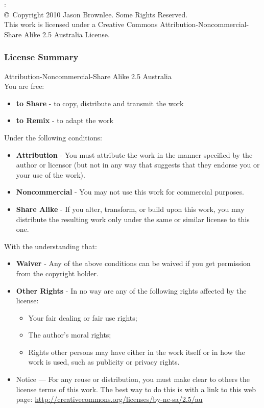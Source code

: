 

\begin{flushleft}

\mybooktitle: \mybooksubtitle \\
\copyright\ Copyright 2010 Jason Brownlee. Some Rights Reserved. \\
This work is licensed under a Creative Commons Attribution-Noncommercial-Share Alike 2.5 Australia License.


\subsubsection*{License Summary}
Attribution-Noncommercial-Share Alike 2.5 Australia \\

You are free:
\begin{itemize}
	\item \textbf{to Share} - to copy, distribute and transmit the work
	\item \textbf{to Remix} - to adapt the work
\end{itemize}

Under the following conditions:
\begin{itemize}
	\item \textbf{Attribution} - You must attribute the work in the manner specified by the author or licensor (but not in any way that suggests that they endorse you or your use of the work).
	\item \textbf{Noncommercial} - You may not use this work for commercial purposes.
	\item \textbf{Share Alike} - If you alter, transform, or build upon this work, you may distribute the resulting work only under the same or similar license to this one.
\end{itemize}

With the understanding that:
\begin{itemize}
	\item \textbf{Waiver} - Any of the above conditions can be waived if you get permission from the copyright holder.
	\item \textbf{Other Rights} - In no way are any of the following rights affected by the license:
	\begin{itemize}
		\item Your fair dealing or fair use rights;
		\item The author's moral rights;
		\item Rights other persons may have either in the work itself or in how the work is used, such as publicity or privacy rights.
	\end{itemize}
	\item Notice — For any reuse or distribution, you must make clear to others the license terms of this work. The best way to do this is with a link to this web page: \url{http://creativecommons.org/licenses/by-nc-sa/2.5/au}
\end{itemize}


\end{flushleft}
